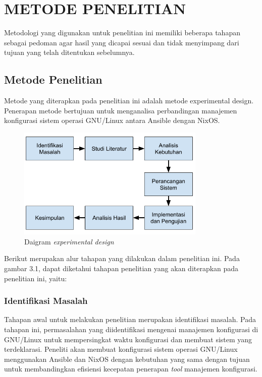 \documentclass[10pt,twoside]{report}
\begin{document}
\chapter{METODE PENELITIAN}
Metodologi yang digunakan untuk penelitian ini memiliki beberapa tahapan
sebagai pedoman agar hasil yang dicapai sesuai dan tidak menyimpang dari tujuan
yang telah ditentukan sebelumnya.\\

\section{Metode Penelitian}
\begin{adjustwidth}{20pt}{}
	\vspace{-3mm}
	\hspace\parindent
	Metode yang diterapkan pada penelitian ini adalah metode experimental design.
	Penerapan metode bertujuan untuk menganalisa perbandingan manajemen
	konfigurasi sistem operasi GNU/Linux antara Ansible dengan NixOS.

	\begin{figure}[h]
		\centering
		\includegraphics[width=0.8\textwidth]{images/metpen.png}
		\caption{Daigram \textit{experimental design}}
	\end{figure}

\end{adjustwidth}
\begin{adjustwidth}{20pt}{}
	\hspace\parindent
	Berikut merupakan alur tahapan yang dilakukan dalam penelitian ini.
	Pada gambar 3.1, dapat diketahui tahapan penelitian yang akan diterapkan
	pada penelitian ini, yaitu:
\end{adjustwidth}
\begin{adjustwidth}{20pt}{}
	\subsection{Identifikasi Masalah}
	\vspace{-3mm}
	\begin{adjustwidth}{20pt}{}
		Tahapan awal untuk melakukan penelitian merupakan identifikasi masalah. Pada
		tahapan ini, permasalahan yang diidentifikasi mengenai manajemen konfigurasi
		di GNU/Linux untuk mempersingkat waktu konfigurasi dan membuat sistem yang
		terdeklarasi. Peneliti akan membuat konfigurasi sistem operasi GNU/Linux
		menggunakan Ansible dan NixOS dengan kebutuhan yang sama dengan tujuan untuk
		membandingkan efisiensi kecepatan penerapan \textit{tool} manajemen konfigurasi.
	\end{adjustwidth}
\end{adjustwidth}
\end{document}
